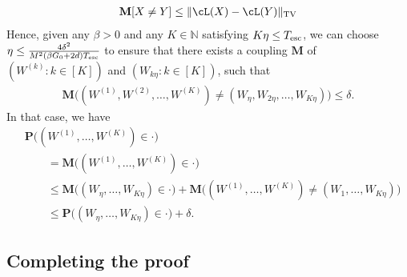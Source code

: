 \documentclass[final,12pt]{colt2018}
\numberwithin{equation}{section}
\numberwithin{equation}{section}
\def\PP{\mathbf{P}}
\def\MM{\mathbf{M}}
\def\Naturals{\mathbb{N}}
\begin{document}
\begin{align*}
	\MM[X \neq Y] \le \|\cL(X)-\cL(Y)\|_{\rm TV}
\end{align*}
Hence, given any $\beta > 0$ and any $K \in \Naturals$ satisfying $K\eta \le T_{\rm esc}$, we can choose $\eta \le \frac{4\delta^2}{M^2(\beta G_0 + 2d)T_{\rm esc}}$ to ensure that there exists a coupling $\MM$ of $(W^{(k)} : k \in [K])$ and $(W_{k\eta} : k \in [K])$, such that
\begin{align*}
	\MM\big((W^{(1)},W^{(2)},\ldots,W^{(K)}) \neq (W_\eta,W_{2\eta},\ldots,W_{K\eta})\big) \le \delta.
\end{align*}
In that case, we have 
\begin{align}\label{eq:path_coupling}
&	\PP\big((W^{(1)},\ldots,W^{(K)}) \in \cdot \big) \nonumber\\
& \qquad = \MM\big((W^{(1)},\ldots,W^{(K)}) \in \cdot \big)  \nonumber\\
& \qquad \le \MM\big((W_\eta,\ldots,W_{K\eta}) \in \cdot \big) + \MM\big( (W^{(1)},\ldots,W^{(K)}) \neq (W_1,\ldots,W_{K\eta})\big) \nonumber\\
& \qquad \le \PP\big((W_\eta,\ldots,W_{K\eta}) \in \cdot  \big)  + \delta.
\end{align}

\subsection{Completing the proof}
\end{document}
